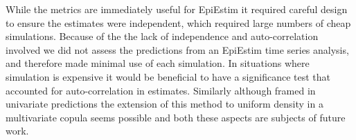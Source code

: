 \documentclass[twoside,11pt,hyphens]{article}
\begin{document}
While the metrics are immediately useful for EpiEstim it required careful design to ensure the estimates were independent, which required large numbers of cheap simulations. Because of the the lack of independence and auto-correlation involved we did not assess the predictions from an EpiEstim time series analysis, and therefore made minimal use of each simulation. In situations where simulation is expensive it would be beneficial to have a significance test that accounted for auto-correlation in estimates. Similarly although framed in univariate predictions the extension of this method to uniform density in a multivariate copula seems possible and both these aspects are subjects of future work.

%
%
%


\end{document}
